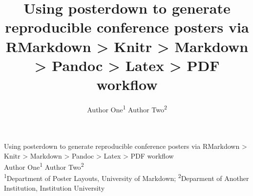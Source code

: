 \documentclass[article,30pt,extrafontsizes]{memoir}
\author{Author One\textsuperscript{1} Author Two\textsuperscript{2}}
\title{\fontfamily{phv}\selectfont Using posterdown to generate reproducible
conference posters via RMarkdown \textgreater{} Knitr \textgreater{}
Markdown \textgreater{} Pandoc \textgreater{} Latex \textgreater{} PDF
workflow}
\begin{document}

\begin{topbox}
  \color{titletextcol}
  \vspace{0.5in}
  \Huge{\selectfont Using posterdown to generate reproducible
conference posters via RMarkdown \textgreater{} Knitr \textgreater{}
Markdown \textgreater{} Pandoc \textgreater{} Latex \textgreater{} PDF
workflow}  \\[0.3in]  %
  \color{authortextcol} \Large{Author One\textsuperscript{1} Author Two\textsuperscript{2}} \\[0.2in] %
  \color{affiliationtextcol} \large{\textsuperscript{1}Department of Poster Layouts, University of Markdown;
\textsuperscript{2}Deparment of Another Institution, Institution
University} %
  \vspace{0.5in}
\end{topbox}

\end{document}
